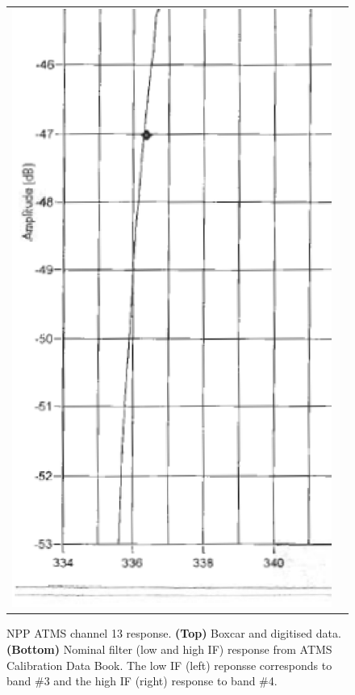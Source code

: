 \begin{figure}[H]
\begin{tabular}{c c}
    \includegraphics[bb=249 194 1431 1035,scale=0.2]{graphics/log_book/ch13_hif.eps}
  \end{tabular}
  \caption{NPP ATMS channel 13 response. \textbf{(Top)} Boxcar and digitised data. \textbf{(Bottom)} Nominal filter (low and high IF) response from ATMS Calibration Data Book\cite{ATMS_PFM_CalLog}. The low IF (left) reponsse corresponds to band \#3 and the high IF (right) response to band \#4.}
  \label{fig:atms_npp.ch13.srf}
\end{figure}

